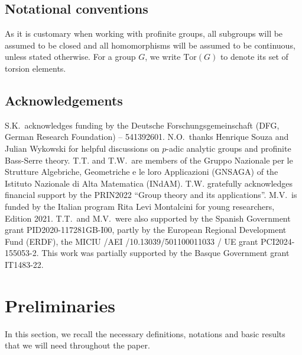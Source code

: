 \documentclass[a4paper,10pt]{amsart}
\theoremstyle{plain}
\theoremstyle{definition}
\numberwithin{equation}{section}
\begin{document}
\subsection*{Notational conventions}

 As it is customary when working with profinite groups, all subgroups will be assumed to be closed and all homomorphisms will be assumed to be continuous, unless stated otherwise. For a group $G$, we write $\mathrm{Tor}(G)$ to denote its set of torsion elements.

\subsection*{Acknowledgements} 
S.K.\ acknowledges funding by the Deutsche Forschungsgemeinschaft (DFG, German
Research Foundation) – 541392601. N.O.\ thanks Henrique Souza and Julian Wykowski for helpful discussions on $p$-adic analytic groups and profinite Bass-Serre theory. T.T. and T.W.\ are members of the Gruppo Nazionale per le Strutture Algebriche, Geometriche e le loro Applicazioni (GNSAGA) of the Istituto Nazionale di Alta Matematica (INdAM). 
T.W. gratefully acknowledges financial support by
the PRIN2022 “Group theory and its applications”. M.V.\ is funded by the Italian program Rita Levi Montalcini for young researchers, Edition 2021. T.T.\ and M.V.\ were also supported by the Spanish Government grant PID2020-117281GB-I00, partly by the European Regional Development Fund (ERDF), the MICIU /AEI /10.13039/501100011033 / UE grant
PCI2024-155053-2. This work was partially supported by the Basque Government grant IT1483-22. 




\section{Preliminaries}

In this section, we recall the necessary definitions, notations and basic results that we will need throughout the paper. 
\end{document}
